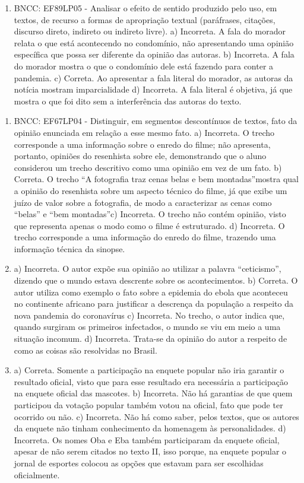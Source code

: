 \begin{enumerate}
\item
BNCC: EF89LP05 - Analisar o efeito de sentido produzido pelo uso, em
textos, de recurso a formas de apropriação textual (paráfrases,
citações, discurso direto, indireto ou indireto livre). a) Incorreta. A fala do morador relata o que está acontecendo no condomínio, não apresentando uma opinião específica que possa ser diferente da opinião das autoras. b) Incorreta. A fala do morador mostra o que o condomínio dele está fazendo para conter a pandemia. c) Correta. Ao apresentar a fala literal do morador, as autoras da notícia mostram imparcialidade d) Incorreta. A fala literal é objetiva, já que mostra o que foi dito sem a interferência das autoras do texto. 
\end{enumerate}


\begin{enumerate}
\item
BNCC: EF67LP04 - Distinguir, em segmentos descontínuos de textos, fato
da opinião enunciada em relação a esse mesmo fato. a) Incorreta. O trecho corresponde a uma informação sobre o enredo do filme; não apresenta, portanto, opiniões do resenhista sobre ele, demonstrando que o aluno considerou um trecho descritivo como uma opinião em vez de um fato. b) Correta. O trecho ``A fotografia traz cenas belas e bem montadas''mostra qual a opinião do resenhista sobre um aspecto técnico do filme, já que exibe um juízo de valor sobre a fotografia, de modo a caracterizar as cenas como ``belas'' e ``bem montadas''c) Incorreta. O trecho não contém opinião, visto que representa apenas o modo como o filme é estruturado. d) Incorreta. O trecho corresponde a uma informação do enredo do filme,
trazendo uma informação técnica da sinopse.

\item
a) Incorreta. O autor expõe sua opinião ao utilizar a palavra
``ceticismo'', dizendo que o mundo estava descrente sobre os
acontecimentos. b) Correta. O autor utiliza como exemplo o fato sobre a epidemia do ebola que aconteceu no continente africano para justificar a descrença da população a respeito da nova pandemia do coronavírus c) Incorreta. No trecho, o autor indica que, quando surgiram os primeiros infectados, o mundo se viu em meio a uma situação incomum. d) Incorreta. Trata-se da opinião do autor a respeito de como as coisas são resolvidas no Brasil.

\item
a) Correta. Somente a participação na enquete popular não iria garantir
o resultado oficial, visto que para esse resultado era necessária a
participação na enquete oficial das mascotes. b) Incorreta. Não há garantias de que quem participou da votação popular também votou na oficial, fato que pode ter ocorrido ou não. c) Incorreta. Não há como saber, pelos textos, que os autores da enquete não tinham conhecimento da homenagem às personalidades. d) Incorreta. Os nomes Oba e Eba também participaram da enquete oficial, apesar de não serem citados no texto II, isso porque, na enquete popular o jornal de esportes colocou as opções que estavam para ser escolhidas oficialmente.
\end{enumerate}

